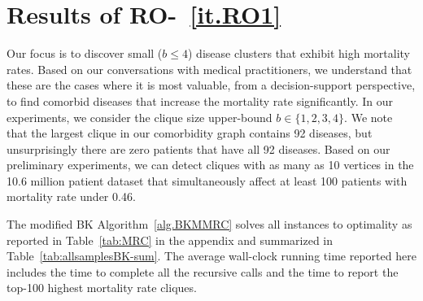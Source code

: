 \section{Results of RO-~\ref{it.RO1}}
Our focus is to discover small ($b \le 4$) disease clusters that exhibit high mortality rates. Based on our conversations with medical practitioners, we understand that these are the cases where it is most valuable, from a decision-support perspective, to find comorbid diseases that increase the mortality rate significantly. In our experiments, we consider the clique size upper-bound $b \in\{1,2,3,4\}$. We note that the largest clique in our comorbidity graph contains 92 diseases, but unsurprisingly there are zero patients that have all 92 diseases. Based on our preliminary experiments, we can detect cliques with as many as 10 vertices in the 10.6 million patient dataset that simultaneously affect at least 100 patients with mortality rate under 0.46.

The modified BK Algorithm~\ref{alg.BKMMRC} solves all instances to optimality as reported in Table~\ref{tab:MRC} in the appendix and summarized in Table~\ref{tab:allsamplesBK-sum}. The average wall-clock running time  reported here includes the time to complete all the recursive calls and the time to report the top-100 highest mortality rate cliques. 


